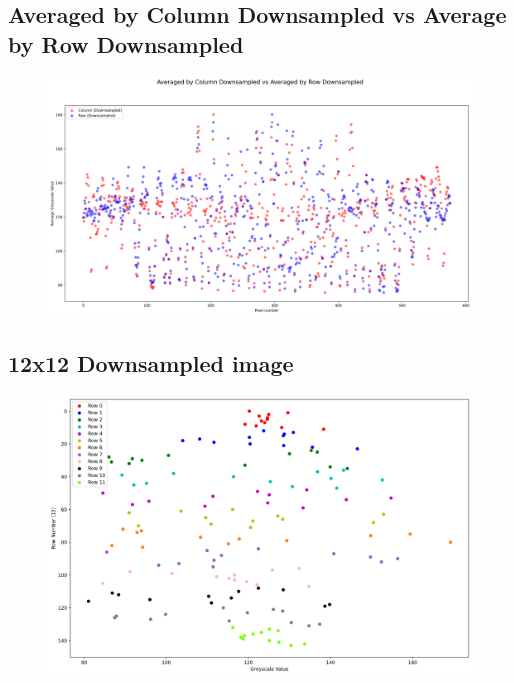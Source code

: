 \documentclass[11pt]{article}
\begin{document}
\begin{appendices}
\subsection{Averaged by Column Downsampled vs Average by Row Downsampled}\label{AvColDSvAvRowDS}
\begin{figure}[h!]
  \centering
  \includegraphics[scale=0.3]{Images/AvColDS vs AvRowDS.png}
\end{figure}

\newpage
\subsection{12x12 Downsampled image}\label{12x12Scatter}
\begin{figure}[h!]
  \centering
  \includegraphics[scale=0.4]{Images/12x12 Scatter.png}
\end{figure}

\newpage

\end{appendices}
\end{document}
